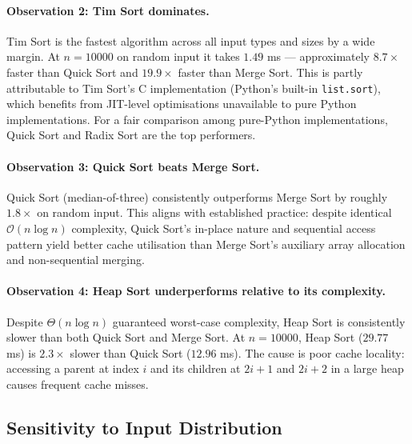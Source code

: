 \documentclass[11pt,a4paper]{article}
\begin{document}
\paragraph{Observation 2: Tim Sort dominates.}
Tim Sort is the fastest algorithm across all input types and sizes by a wide margin.
At $n = 10000$ on random input it takes $1.49$ ms — approximately $8.7\times$ faster
than Quick Sort and $19.9\times$ faster than Merge Sort.
This is partly attributable to Tim Sort's C implementation (Python's built-in
\texttt{list.sort}), which benefits from JIT-level optimisations unavailable to pure
Python implementations.
For a fair comparison among pure-Python implementations, Quick Sort and Radix Sort are
the top performers.

\paragraph{Observation 3: Quick Sort beats Merge Sort.}
Quick Sort (median-of-three) consistently outperforms Merge Sort by roughly $1.8\times$
on random input. This aligns with established practice: despite identical $\mathcal{O}(n\log n)$
complexity, Quick Sort's in-place nature and sequential access pattern yield better
cache utilisation than Merge Sort's auxiliary array allocation and non-sequential
merging.

\paragraph{Observation 4: Heap Sort underperforms relative to its complexity.}
Despite $\Theta(n \log n)$ guaranteed worst-case complexity, Heap Sort is consistently
slower than both Quick Sort and Merge Sort.
At $n = 10000$, Heap Sort ($29.77$ ms) is $2.3\times$ slower than Quick Sort ($12.96$ ms).
The cause is poor cache locality: accessing a parent at index $i$ and its children at
$2i+1$ and $2i+2$ in a large heap causes frequent cache misses.

\subsection{Sensitivity to Input Distribution}
\end{document}
